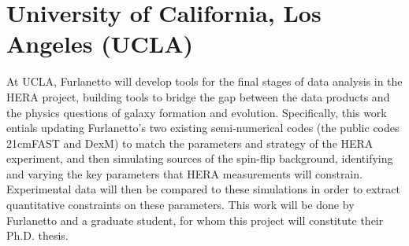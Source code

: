 \documentclass[preprint]{aastex}
\begin{document}
\section*{University of California, Los Angeles (UCLA)}

At UCLA, Furlanetto will develop tools for the final stages of data analysis in the HERA
project, building tools to bridge the gap between the data products and the
physics questions of galaxy formation and evolution. Specifically, this work
entials updating Furlanetto’s two existing semi-numerical codes
(the public codes 21cmFAST and DexM) to match the parameters and 
strategy of the HERA experiment, and then
simulating sources of the spin-flip background, identifying and
varying the key parameters that HERA measurements will constrain.
Experimental data will then be compared to these simulations in order to
extract quantitative constraints on these parameters. This work will be done by
Furlanetto and a graduate student, for whom this project will constitute their
Ph.D. thesis.
\end{document}
